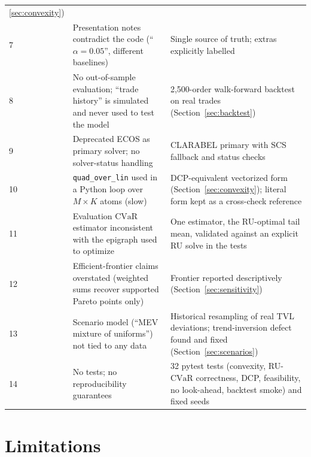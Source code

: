 \documentclass[11pt,a4paper]{article}
\theoremstyle{remark}
\newcommand{\cvar}{\texorpdfstring{\ensuremath{\mathrm{CVaR}}}{CVaR}}
\newcommand{\code}[1]{\texttt{#1}}
\begin{document}
\begin{table}[H]
\begin{tabular}{@{}p{0.5cm}p{6.4cm}p{6.2cm}@{}}
     \ref{sec:convexity}) \\
7 & Presentation notes contradict the code (``$\alpha=0.05$'', different baselines)
   & Single source of truth; extras explicitly labelled \\
8 & No out-of-sample evaluation; ``trade history'' is simulated and never used to test the
     model & 2{,}500-order walk-forward backtest on real trades (Section~\ref{sec:backtest}) \\
9 & Deprecated ECOS as primary solver; no solver-status handling
   & CLARABEL primary with SCS fallback and status checks \\
10 & \code{quad\_over\_lin} used in a Python loop over $M\times K$ atoms (slow)
   & DCP-equivalent vectorized form (Section~\ref{sec:convexity}); literal form kept as a
     cross-check reference \\
11 & Evaluation \cvar{} estimator inconsistent with the epigraph used to optimize
   & One estimator, the RU-optimal tail mean, validated against an explicit RU solve in the
     tests \\
12 & Efficient-frontier claims overstated (weighted sums recover supported Pareto points only)
   & Frontier reported descriptively (Section~\ref{sec:sensitivity}) \\
13 & Scenario model (``MEV mixture of uniforms'') not tied to any data
   & Historical resampling of real TVL deviations; trend-inversion defect found and fixed
     (Section~\ref{sec:scenarios}) \\
14 & No tests; no reproducibility guarantees
   & 32 pytest tests (convexity, RU-\cvar{} correctness, DCP, feasibility, no look-ahead,
     backtest smoke) and fixed seeds \\
\bottomrule
\end{tabular}
\end{table}

\section{Limitations}
\label{sec:limitations}
\end{document}
